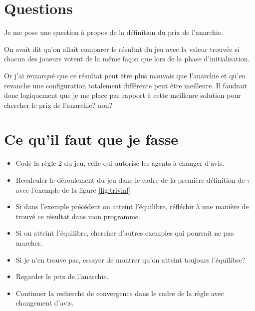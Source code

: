 \documentclass[12pt]{article}
\theoremstyle{defi}
\theoremstyle{not}
\theoremstyle{prob}
\begin{document}
  \section{Questions}
    Je me pose une question à propos de la définition du prix de l'anarchie.

    On avait dit qu'on allait comparer le résultat du jeu avec la valeur trouvée si chacun des joueurs votent de la même façon que lors de la phase d'initialisation.

    Or j'ai remarqué que ce résultat peut être plus mauvais que l'anarchie et qu'en revanche une configuration totalement différente peut être meilleure. Il faudrait donc logiquement que je me place par rapport à cette meilleure solution pour chercher le prix de l'anarchie? non?


\color{black}
\section{Ce qu'il faut que je fasse}

\begin{itemize}
  \color{red}
  \item Codé la règle 2 du jeu, celle qui autorise les agents à changer d'avis.
  \item Recalculer le déroulement du jeu dans le cadre de la première définition de $\tau$ avec l'exemple de la figure \ref{fig:trivial}
  \item Si dans l'exemple précédent on atteint l'équilibre, réfléchir à une manière de trouvé ce résultat dans mon programme.
  \item Si on atteint l'équilibre, chercher d'autres exemples qui pourrait ne pas marcher.
  \item Si je n'en trouve pas, essayer de montrer qu'on atteint toujours l'équilibre?
  \color{black}
  \item Regarder le prix de l'anarchie.
  \color{blue}
  \item Continuer la recherche de convergence dans le cadre de la règle avec changement d'avis.
\end{itemize}
\end{document}
